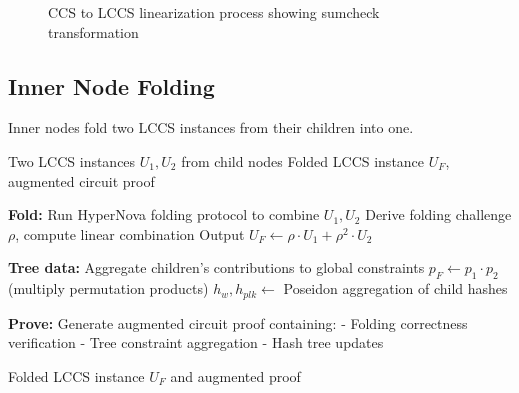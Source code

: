 \documentclass[11pt,a4paper]{article}
\theoremstyle{plain}
\theoremstyle{definition}
\begin{document}
\begin{figure}[h]
\caption{CCS to LCCS linearization process showing sumcheck transformation}
\end{figure}

\subsection{Inner Node Folding}

Inner nodes fold two LCCS instances from their children into one.

\begin{algorithm}
\caption{Inner Node Folding}
\begin{algorithmic}[1]
\Require Two LCCS instances $U_1, U_2$ from child nodes
\Ensure Folded LCCS instance $U_F$, augmented circuit proof

\State \textbf{Fold:} Run HyperNova folding protocol to combine $U_1, U_2$
\State \quad Derive folding challenge $\rho$, compute linear combination
\State \quad Output $U_F \leftarrow \rho \cdot U_1 + \rho^2 \cdot U_2$

\State \textbf{Tree data:} Aggregate children's contributions to global constraints
\State \quad $p_F \leftarrow p_1 \cdot p_2$ (multiply permutation products)
\State \quad $h_w, h_{plk} \leftarrow$ Poseidon aggregation of child hashes

\State \textbf{Prove:} Generate augmented circuit proof containing:
\State \quad - Folding correctness verification
\State \quad - Tree constraint aggregation
\State \quad - Hash tree updates

\State \Return Folded LCCS instance $U_F$ and augmented proof
\end{algorithmic}
\end{algorithm}
\end{document}
